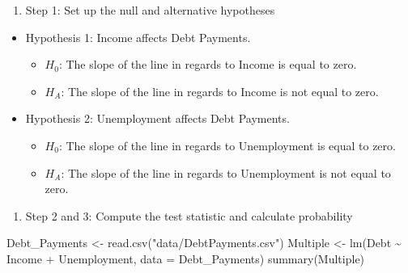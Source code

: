 \documentclass[
  letterpaper,
  DIV=11,
  numbers=noendperiod]{scrreprt}
\newenvironment{Shaded}{\begin{snugshade}}{\end{snugshade}}
\newcommand{\AttributeTok}[1]{\textcolor[rgb]{0.40,0.45,0.13}{#1}}
\newcommand{\FunctionTok}[1]{\textcolor[rgb]{0.28,0.35,0.67}{#1}}
\newcommand{\NormalTok}[1]{\textcolor[rgb]{0.00,0.23,0.31}{#1}}
\newcommand{\OtherTok}[1]{\textcolor[rgb]{0.00,0.23,0.31}{#1}}
\newcommand{\SpecialCharTok}[1]{\textcolor[rgb]{0.37,0.37,0.37}{#1}}
\newcommand{\StringTok}[1]{\textcolor[rgb]{0.13,0.47,0.30}{#1}}
\providecommand{\tightlist}{%
  \setlength{\itemsep}{0pt}\setlength{\parskip}{0pt}}\usepackage{longtable,booktabs,array}
\begin{document}
\begin{enumerate}
\def\labelenumi{\arabic{enumi}.}
\tightlist
\item
  Step 1: Set up the null and alternative hypotheses
\end{enumerate}

\begin{itemize}
\tightlist
\item
  Hypothesis 1: Income affects Debt Payments.

  \begin{itemize}
  \tightlist
  \item
    \(H_0\): The slope of the line in regards to Income is equal to
    zero.
  \item
    \(H_A\): The slope of the line in regards to Income is not equal to
    zero.
  \end{itemize}
\item
  Hypothesis 2: Unemployment affects Debt Payments.

  \begin{itemize}
  \tightlist
  \item
    \(H_0\): The slope of the line in regards to Unemployment is equal
    to zero.
  \item
    \(H_A\): The slope of the line in regards to Unemployment is not
    equal to zero.
  \end{itemize}
\end{itemize}

\begin{enumerate}
\def\labelenumi{\arabic{enumi}.}
\setcounter{enumi}{1}
\tightlist
\item
  Step 2 and 3: Compute the test statistic and calculate probability
\end{enumerate}

\begin{Shaded}
\begin{Highlighting}[]
\NormalTok{Debt\_Payments }\OtherTok{\textless{}{-}} \FunctionTok{read.csv}\NormalTok{(}\StringTok{"data/DebtPayments.csv"}\NormalTok{)}
\NormalTok{Multiple }\OtherTok{\textless{}{-}} \FunctionTok{lm}\NormalTok{(Debt }\SpecialCharTok{\textasciitilde{}}\NormalTok{ Income }\SpecialCharTok{+}\NormalTok{ Unemployment, }\AttributeTok{data =}\NormalTok{ Debt\_Payments)}
\FunctionTok{summary}\NormalTok{(Multiple)}
\end{Highlighting}
\end{Shaded}
\end{document}
